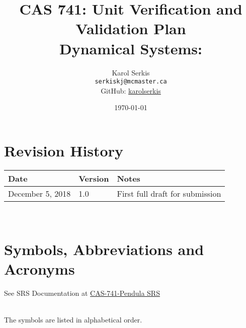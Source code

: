 \documentclass[12pt, titlepage]{article}
\begin{document}
\title{CAS 741: Unit Verification and Validation Plan\\[10pt]\Large Dynamical Systems: \progname}
\author{Karol Serkis\\\texttt{serkiskj@mcmaster.ca}\\GitHub:
\href{https://www.github.com/karolserkis}{karolserkis}}
\date{\today}
	
\maketitle


\section{Revision History}

\begin{tabularx}{\textwidth}{p{4cm}p{2cm}X}
\toprule {\bf Date} & {\bf Version} & {\bf Notes}\\
\midrule
December 5, 2018 & 1.0 &  First full draft for submission\\
\bottomrule
\end{tabularx}

~\newpage

\section{Symbols, Abbreviations and Acronyms}

See SRS Documentation at 
\href{https://github.com/karolserkis/CAS-741-Pendula/blob/master/docs/SRS/SRS.pdf}{CAS-741-Pendula SRS}
 

\\
The symbols are listed in alphabetical order.\\
\end{document}
